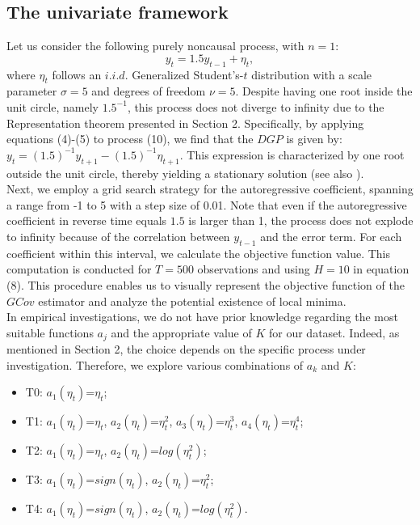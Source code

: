 \documentclass[<1p>]{elsarticle} %
\begin{document}
\subsection{The univariate framework}
Let us consider the following purely noncausal process, with $n=1$:
\begin{equation}
y_t = 1.5 y_{t-1} + \eta_t,
\end{equation}
where $\eta_t$ follows an $i.i.d.$ Generalized Student's-$t$ distribution with a scale parameter $\sigma=5$ and degrees of freedom $\nu =5$. Despite having one root inside the unit circle, namely $1.5^{-1}$, this process does not diverge to infinity due to the Representation theorem presented in Section 2. Specifically, by applying equations (4)-(5) to process (10), we find that the $DGP$ is given by: $y_t=(1.5)^{-1} y_{t+1}-(1.5)^{-1}\eta_{t+1}$. This expression is characterized by one root outside the unit circle, thereby yielding a stationary solution (see also \cite{lanne2011noncausal}).\\
\indent Next, we employ a grid search strategy for the autoregressive coefficient, spanning a range from -1 to 5 with a step size of 0.01. Note that even if the autoregressive coefficient in reverse time equals $1.5$ is larger than 1, the process does not explode to infinity because of the correlation between $y_{t-1}$ and the error term. For each coefficient within this interval, we calculate the objective function value. This computation is conducted for $T=500$ observations and using $H=10$ in equation (8). 
This procedure enables us to visually represent the objective function of the $GCov$ estimator and analyze the potential existence of local minima.\\
\indent In empirical investigations, we do not have prior knowledge regarding the most suitable functions $a_j$ and the appropriate value of $K$ for our dataset. Indeed, as mentioned in Section 2, the choice depends on the specific process under investigation. Therefore, we explore various combinations of $a_k$ and $K$:
\begin{itemize}
\item T0:   $a_{1}(\eta_t)$=$\eta_t$;

\item T1: $a_{1}(\eta_t)$=$\eta_t$,
	   $a_{2}(\eta_t)$=$\eta_t^{2}$,
	   $a_{3}(\eta_t)$=$\eta_t^{3}$,
	   $a_{4}(\eta_t)$=$\eta_t^{4}$;
 
 \item T2:  $a_{1}(\eta_t)$=$\eta_t$,
            $a_{2}(\eta_t)$=$log(\eta_t^{2})$;

 \item T3:  $a_{1}(\eta_t)$=$sign(\eta_{t})$,
            $a_{2}(\eta_t)$=$\eta_t^{2}$;
 
 \item T4: $a_{1}(\eta_t)$=$sign(\eta_t)$,
	$a_{2}(\eta_t)$=$log(\eta_t^{2})$.
\end{itemize}
\end{document}
